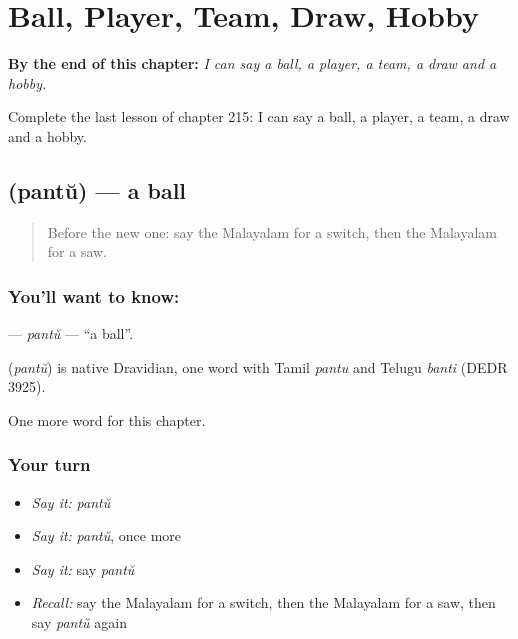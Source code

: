 
\chapter{Ball, Player, Team, Draw, Hobby}
\label{ch:ml-ball-player-team-draw-hobby}

\begin{chapteropening}
\textbf{By the end of this chapter:} \emph{I can say a ball, a player, a team, a draw and a hobby.}

Complete the last lesson of chapter 215: I can say a ball, a player, a team, a draw and a hobby.
\end{chapteropening}

\section[\texorpdfstring{\ml{പന്ത്} (pantŭ)}{പന്ത് (pantŭ)}]{ (pantŭ) — a ball}

\label{lesson:ML-C215-pantu}



\begin{quote}
Before the new one: say the Malayalam for a switch, then the Malayalam for a saw.
\end{quote}

\subsection*{You'll want to know: }
\textbf{} — \emph{pantŭ} — \textquotedblleft{}a ball\textquotedblright{}.

\begin{cousinweb}
\textbf{} (\emph{pantŭ}) is native Dravidian, one word with Tamil \emph{pantu} and Telugu \emph{banti} (DEDR 3925).
\end{cousinweb}

\begin{grammarlens}[title={What you've built}]
One more word for this chapter.
\end{grammarlens}

\subsection*{Your turn}
\begin{itemize}
\raggedright
  \item \emph{Say it:} \emph{pantŭ}
  \item \emph{Say it:} \emph{pantŭ}, once more
  \item \emph{Say it:} say \emph{pantŭ}
  \item \emph{Recall:} say the Malayalam for a switch, then the Malayalam for a saw, then say \emph{pantŭ} again
\end{itemize}

